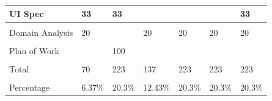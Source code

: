 \documentclass[letterpaper,english, 12pt]{scrreprt}
\begin{document}
\begin{center}
\begin{tabular}{|l|C{2cm}|C{1.5cm}|C{1.5cm}|C{1.5cm}|C{1.5cm}|C{1.5cm}|}
UI Spec                 &      33       &      33       &               &               &               &       33      \\ \hline
                        &               &               &               &               &               &               \\ \hline

Domain Analysis         &      20       &               &       20      &      20       &       20      &       20      \\ \hline
                        &               &               &               &               &               &               \\ \hline

Plan of Work            &               &     100       &               &               &               &               \\ \hline

                        &               &               &               &               &               &               \\ \hline
Total                   &      70       &     223       &      137      &     223       &      223      &      223      \\ \hline
			&		&		&		&		&		&		\\ \hline
Percentage		&	6.37\%	&	20.3\%	&	12.43\%	&	20.3\%	&	20.3\%	&	20.3\%	\\ \hline
	\end{tabular}
\end{center}
\end{document}
